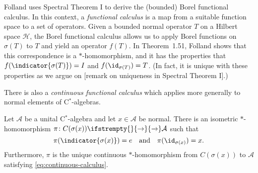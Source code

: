 \documentclass[article, a4paper, 11pt, oneside]{memoir}
\numberwithin{equation}{chapter}
\newcommand{\calA}{\mathcal{A}}
\newcommand{\calH}{\mathcal{H}}
\renewcommand\to[1][]{%
    \ifstrempty{#1}{%
        \rightarrow
    }{%
        \xrightarrow[#1]{}
    }%
}
\begin{document}
\begin{remark}
    Folland uses Spectral Theorem I to derive the (bounded) Borel functional calculus. In this context, a \emph{functional calculus} is a map from a suitable function space to a set of operators. Given a bounded normal operator $T$ on a Hilbert space $\calH$, the Borel functional calculus allows us to apply Borel functions on $\sigma(T)$ to $T$ and yield an operator $f(T)$. In Theorem~1.51, Folland shows that this correspondence is a $*$-homomorphism, and it has the properties that $f(\indicator{\sigma(T)}) = I$ and $f(\id_{\sigma(T)}) = T$. (In fact, it is unique with these properties as we argue on [remark on uniqueness in Spectral Theorem I].)

    There is also a \emph{continuous functional calculus} which applies more generally to normal elements of C$^*$-algebras.
\end{remark}

\begin{theorem}
    Let $\calA$ be a unital C$^*$-algebra and let $x \in \calA$ be normal. There is an isometric $*$-homomorphism $\pi \colon C(\sigma(x)) \to \calA$ such that
    \begin{equation}
        \label{eq:continuous-calculus}
        \pi(\indicator{\sigma(x)}) = e
        \quad \text{and} \quad
        \pi(\id_{\sigma(x)}) = x.
    \end{equation}
    Furthermore, $\pi$ is the unique continuous $*$-homomorphism from $C(\sigma(x))$ to $\calA$ satisfying \cref{eq:continuous-calculus}.
\end{theorem}
\end{document}
